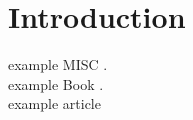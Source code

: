 
\section{Introduction}
example MISC \cite{exampleMISC}.\\
example Book \cite{exampleBOOK}.\\
example article \cite[p.~5]{exampleARTICLE}